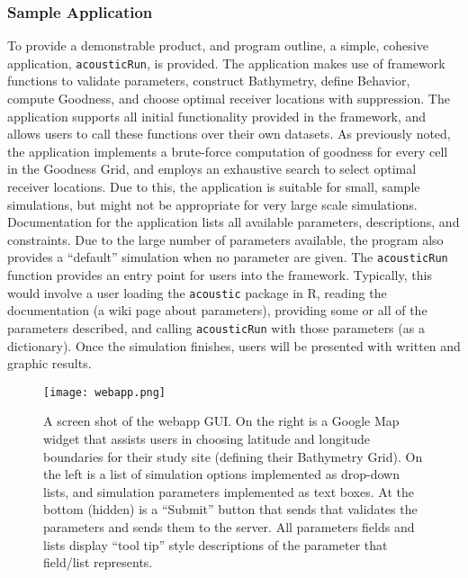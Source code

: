 \subsubsection{Sample Application}
To provide a demonstrable product, and program outline, a simple, cohesive application, \texttt{acousticRun}, is provided.  The application makes use of framework functions to validate parameters, construct Bathymetry, define Behavior, compute Goodness, and choose optimal receiver locations with suppression.  The application supports all initial functionality provided in the framework, and allows users to call these functions over their own datasets.  As previously noted, the application implements a brute-force computation of goodness for every cell in the Goodness Grid, and employs an exhaustive search to select optimal receiver locations.  Due to this, the application is suitable for small, sample simulations, but might not be appropriate for very large scale simulations.  Documentation \cite{acousticdeployWiki} for the application lists all available parameters, descriptions, and constraints.  Due to the large number of parameters available, the program also provides a ``default'' simulation when no parameter are given.  The \texttt{acousticRun} function provides an entry point for users into the framework.  Typically, this would involve a user loading the \texttt{acoustic} package in R, reading the documentation (a wiki page about parameters), providing some or all of the parameters described, and calling \texttt{acousticRun} with those parameters (as a dictionary).  Once the simulation finishes, users will be presented with written and graphic results. 

\begin{figure}[ht]
	\centering
	\texttt{[image: webapp.png]}
	\caption{A screen shot of the webapp GUI.  On the right is a Google Map widget that assists users in choosing latitude and longitude boundaries for their study site (defining their Bathymetry Grid).  On the left is a list of simulation options implemented as drop-down lists, and simulation parameters implemented as text boxes.  At the bottom (hidden) is a ``Submit'' button that sends that validates the parameters and sends them to the server.  All parameters fields and lists display ``tool tip'' style descriptions of the parameter that field/list represents.
		\label{webApp}}
\end{figure}


